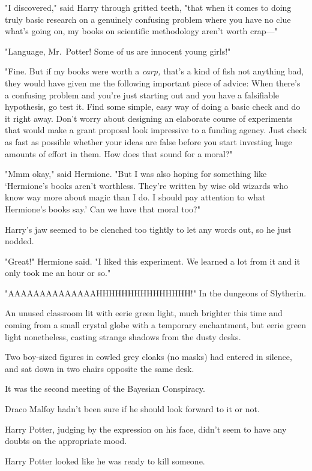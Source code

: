 "I discovered," said Harry through gritted teeth, "that when it comes to doing
truly basic research on a genuinely confusing problem where you have no clue
what's going on, my books on scientific methodology aren't worth crap\mbox{---}"

"Language, Mr.~Potter! Some of us are innocent young girls!"

"Fine. But if my books were worth a \emph{carp,} that's a kind of fish not
anything bad, they would have given me the following important piece of advice:
When there's a confusing problem and you're just starting out and you have a
falsifiable hypothesis, go test it. Find some simple, easy way of doing a basic
check and do it right away. Don't worry about designing an elaborate course of
experiments that would make a grant proposal look impressive to a funding
agency. Just check as fast as possible whether your ideas are false before you
start investing huge amounts of effort in them. How does that sound for a
moral?"

"Mmm{\el} okay," said Hermione. "But I was also hoping for something like
`Hermione's books aren't worthless. They're written by wise old wizards who
know way more about magic than I do. I should pay attention to what Hermione's
books say.' Can we have that moral too?"

Harry's jaw seemed to be clenched too tightly to let any words out, so he just
nodded.

"Great!" Hermione said. "I liked this experiment. We learned a lot from it and
it only took me an hour or so."

"AAAAAAAAAAAAAAHHHHHHHHHHHHHHH!"
\sbreak
In the dungeons of Slytherin.

An unused classroom lit with eerie green light, much brighter this time and
coming from a small crystal globe with a temporary enchantment, but eerie green
light nonetheless, casting strange shadows from the dusty desks.

Two boy-sized figures in cowled grey cloaks (no masks) had entered in silence,
and sat down in two chairs opposite the same desk.

It was the second meeting of the Bayesian Conspiracy.

Draco Malfoy hadn't been sure if he should look forward to it or not.

Harry Potter, judging by the expression on his face, didn't seem to have any
doubts on the appropriate mood.

Harry Potter looked like he was ready to kill someone.

